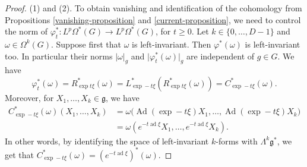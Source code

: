\documentclass[JEP,XML,SOM,Unicode,published]{cedram}
\theoremstyle{plain}
\theoremstyle{remark}
\theoremstyle{definition}
\DeclareMathOperator{\ad}{ad}
\DeclareMathOperator{\Ad}{Ad}
\begin{document}
\begin{proof} (1) and (2). To obtain vanishing and identification of the cohomology from Propositions \ref{vanishing-proposition} and \ref{current-proposition}, we need to control the norm of
$\varphi^*_t: L^p \Omega^*(G)
\to L^p \Omega^*(G)$, for $t \geqslant 0$.
Let $k \in \{0, \dots, D-1\}$ and $\omega \in \Omega^k(G)$. Suppose first that $\omega$ is left-invariant. Then $\varphi^* (\omega)$
is left-invariant too. In particular their norms $\vert \omega \vert_g$ and $\vert \varphi_t^* (\omega) \vert_g$ are independent of $g \in G$.
We have
\[ \varphi_t^* (\omega) = R_{\exp t \xi}^* (\omega)
= L^*_{\exp -t\xi}(R_{\exp t \xi}^* (\omega)) = C_{\exp -t\xi}^* (\omega). \]
Moreover, for $X_1, \dots, X_k \in \mathfrak g$, we have
\begin{align*}
C_{\exp -t\xi}^* (\omega) (X_1, \dots, X_k)&
= \omega \bigl(\Ad (\exp -t \xi) X_1, \dots, \Ad (\exp -t \xi) X_k\bigr)\\
& = \omega (e^{-t \ad \xi} X_1, \dots, e^{-t \ad \xi} X_k).
\end{align*}
In other words, by identifying the space of left-invariant $k$-forms with $\Lambda^k \mathfrak g^*$, we get that
$C_{\exp -t\xi}^* (\omega) = (e^{-t \ad \xi})^* (\omega).$


\end{proof}
\end{document}
